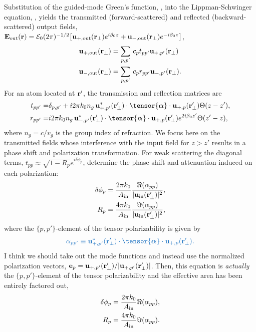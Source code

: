 \documentclass[preprint,aps,pra,onecolumn]{revtex4-1} %
\newcommand{\out}{{\rm out}}
\newcommand{\fwd}{+}
\newcommand{\bwd}{-}
\newcommand{\trans}{+}
\newcommand{\refl}{-}
\newcommand{\change}[1]{{\color{RoyalBlue} #1}}
\newcommand{\comment}[1]{{\color{Maroon} #1}}
\begin{document}
Substitution of the guided-mode Green's function, , into the Lippman-Schwinger equation, , yields the transmitted (forward-scattered) and reflected (backward-scattered) output fields, $\mathbf{E}_{\out}(\br) = \mathcal{E}_0 (2\pi)^{-1/2} \big[ \mathbf{u}_{\trans, \out} (\br_\perp) e^{i \beta_0 z} + \mathbf{u}_{\refl,\out} (\br_\perp) e^{-i \beta_0 z} \big]$, 
	\begin{align}
		\mathbf{u}_{\trans, \out} (\br_\perp) &=  \sum_{p,p'}  \, c_{p} t_{pp'} \mathbf{u}_{\fwd, p'}(\br_\perp) \\ 
		\mathbf{u}_{\refl,\out} (\br_\perp) &=  \sum_{p,p'}  \, c_{p} r_{pp'} \mathbf{u}_{\bwd, p'}(\br_\perp). 
	\end{align}
For an atom located at $\mathbf{r}'$, the transmission and reflection matrices are 
	\begin{align} \label{Eq::PolarizationTransformation}
		t_{pp'} =& \delta_{p,p'} + i 2\pi k_0 n_g \, \mathbf{u}^*_{+, p'}(\br'_\perp) \cdot 
\tensor{\boldsymbol{\alpha}} \cdot \mathbf{u}_{+, p}(\br'_\perp) \Theta ( z-z' ) , \\
		r_{pp'} =& i 2\pi k_0 n_g \, \mathbf{u}^*_{\bwd, p'}(\br'_\perp) \cdot 
\tensor{\boldsymbol{\alpha}} \cdot \mathbf{u}_{\fwd, p}(\br'_\perp) e^{2 i\beta_0 z'} \Theta ( z'-z ) , 
	\end{align} 
where $n_g = c/v_g$ is the group index of refraction.  We focus here on the transmitted fields whose interference with the input field for $z>z'$ results in a phase shift and polarization transformation.  For weak scattering the diagonal terms, $t_{p p} \approx \sqrt{1-R_p}e^{i \delta \phi_p}$, determine the phase shift and attenuation induced on each polarization:
	\begin{align}
		\delta \phi_p &= \frac{2 \pi k_0}{A_{\rm in}} \frac{\Re(\alpha_{pp})}{|\mathbf{u}_{\rm in}(\mathbf{r}'_\perp)|^{2}} , \label{Eq::PhaseShift} \\
		R_p &=  \frac{4 \pi k_0}{A_{\rm in}}\frac{\Im(\alpha_{pp})}{|\mathbf{u}_{\rm in}(\mathbf{r}'_\perp)|^{2}} , \label{Eq::Attenuation}
	\end{align}
where the $\{p,p'\}$-element of the tensor polarizability is given by 
	\begin{align} \label{Eq::PolarizabilityElementsClassical}
		\change{\alpha_{pp'} \equiv \mathbf{u}^*_{+,p'}(\br'_\perp) \cdot \tensor{\boldsymbol{\alpha}}\cdot \mathbf{u}_{+, p}(\br'_\perp). }
	\end{align} 
\comment{I think we should take out the mode functions and instead use the normalized polarization vectors, $\mathbf{e}_p = \mathbf{u}_{+,p'}(\mathbf{r}'_\perp)/|\mathbf{u}_{+,p'}(\mathbf{r}'_\perp)|$. Then, this equation is \emph{actually} the $\{p,p'\}$-element of the tensor polarizability and the effective area has been entirely factored out,
	\begin{align}
		\delta \phi_p &= \frac{2 \pi k_0}{A_{\rm in}} \Re(\alpha_{pp}),  \\
		R_p &=  \frac{4 \pi k_0}{A_{\rm in}} \Im(\alpha_{pp}) .
	  \end{align} 
}
\end{document}
